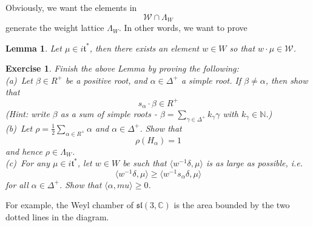 \documentclass[11pt]{book}
\newtheorem{lemma}[theorem]{Lemma}
\newtheorem{exercise}[theorem]{Exercise}
\newcommand{\bb}[1]{\mathbb{#1}}
\newcommand{\mc}[1]{\mathcal{#1}}
\newcommand{\mf}[1]{\mathfrak{#1}}
\begin{document}
Obviously, we want the elements in $$\mc{W} \cap \Lambda_W$$ generate the weight lattice $\Lambda_W$. In other words, we want to prove
\begin{lemma}
Let $\mu \in i\mf{t}^*$, then there exists an element $w \in W$ so that $w \cdot \mu \in \mc{W}$.
\end{lemma}
\begin{exercise}
Finish the above Lemma by proving the following:\\
(a)\ Let $\beta \in R^+$ be a positive root, and $\alpha \in \Delta^+$ a simple root. If $\beta \neq \alpha$, then show that
$$s_{\alpha} \cdot \beta \in R^+$$
(Hint: write $\beta$ as a sum of simple roots - $\beta = \sum_{\gamma \in \Delta^+} k_{\gamma} \gamma$ with $k_{\gamma} \in \bb{N}$.)\\
(b)\ Let $\rho = \frac{1}{2}\sum_{\alpha \in R^+} \alpha$ and $\alpha \in \Delta^+$. Show that
$$\rho(H_{\alpha}) = 1$$
and hence $\rho \in \Lambda_W$.\\
(c)\  For any $\mu \in i\mf{t}^*$, let $w \in W$ be such that $\langle w^{-1}\delta, \mu \rangle$ is as large as possible, i.e.
$$\langle w^{-1}\delta, \mu \rangle \geq \langle w^{-1}s_{\alpha}\delta, \mu \rangle$$
for all $\alpha \in \Delta^+$. Show that $\langle \alpha, mu \rangle \geq 0$.
\end{exercise}
For example, the Weyl chamber of $\mf{sl}(3,\bb{C})$ is the area bounded by the two dotted lines in the diagram.
\end{document}
